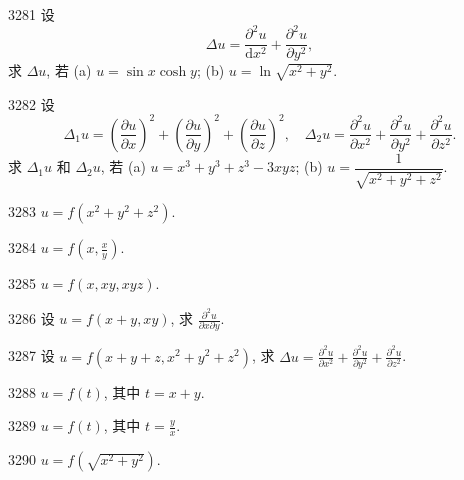 \begin{prob}[M]{3281}
设
\[
\Delta u = \frac{\partial^2 u}{\mathrm{d}x^2} + \frac{\partial^2 u}{\partial y^2},
\]
求 $\Delta u$, 若 (a) $u = \sin x \cosh y$; (b) $u = \ln \sqrt{x^2 + y^2}$.
\end{prob}

\begin{prob}[M]{3282}
设
\[
\Delta_1 u = \left(\frac{\partial u}{\partial x}\right)^2 + \left(\frac{\partial u}{\partial y}\right)^2 + \left(\frac{\partial u}{\partial z}\right)^2, \quad \Delta_2 u = \frac{\partial^2 u}{\partial x^2} + \frac{\partial^2 u}{\partial y^2} + \frac{\partial^2 u}{\partial z^2}.
\]
求 $\Delta_1 u$ 和 $\Delta_2 u$, 若 (a) $u = x^3 + y^3 + z^3 - 3xyz$; (b) $u = \dfrac{1}{\sqrt{x^2 + y^2 + z^2}}$.
\end{prob}


\begin{prob}[S]{3283}
$u = f(x^2 + y^2 + z^2)$.
\end{prob}

\begin{prob}[S]{3284}
$u = f\left(x, \frac{x}{y}\right)$.
\end{prob}

\begin{prob}[S]{3285}
$u = f(x, xy, xyz)$.
\end{prob}

\begin{prob}[S]{3286}
设 $u = f(x + y, xy)$, 求 $\frac{\partial^2 u}{\partial x \partial y}$.
\end{prob}

\begin{prob}[S]{3287}
设 $u = f(x + y + z, x^2 + y^2 + z^2)$, 求 $\Delta u = \frac{\partial^2 u}{\partial x^2} + \frac{\partial^2 u}{\partial y^2} + \frac{\partial^2 u}{\partial z^2}$.
\end{prob}


\begin{prob}[S]{3288}
$u = f(t)$, 其中 $t = x + y$.
\end{prob}

\begin{prob}[S]{3289}
$u = f(t)$, 其中 $t = \frac{y}{x}$.
\end{prob}

\begin{prob}[S]{3290}
$u = f(\sqrt{x^2 + y^2})$.
\end{prob}

